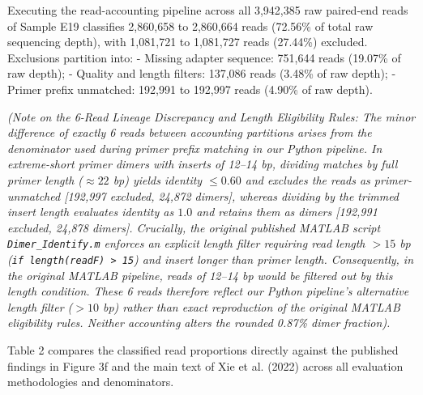 \documentclass[
]{article}
\begin{document}
Executing the read-accounting pipeline across all 3,942,385 raw
paired-end reads of Sample E19 classifies 2,860,658 to 2,860,664 reads
(72.56\% of total raw sequencing depth), with 1,081,721 to 1,081,727
reads (27.44\%) excluded. Exclusions partition into: - Missing adapter
sequence: 751,644 reads (19.07\% of raw depth); - Quality and length
filters: 137,086 reads (3.48\% of raw depth); - Primer prefix unmatched:
192,991 to 192,997 reads (4.90\% of raw depth).

\emph{(Note on the 6-Read Lineage Discrepancy and Length Eligibility
Rules: The minor difference of exactly 6 reads between accounting
partitions arises from the denominator used during primer prefix
matching in our Python pipeline. In extreme-short primer dimers with
inserts of 12--14 bp, dividing matches by full primer length
(\(\approx 22\) bp) yields identity \(\le 0.60\) and excludes the reads
as primer-unmatched {[}192,997 excluded, 24,872 dimers{]}, whereas
dividing by the trimmed insert length evaluates identity as \(1.0\) and
retains them as dimers {[}192,991 excluded, 24,878 dimers{]}. Crucially,
the original published MATLAB script \texttt{Dimer\_Identify.m} enforces
an explicit length filter requiring read length \(> 15\) bp
(\texttt{if\ length(readF)\ \textgreater{}\ 15}) and insert longer than
primer length. Consequently, in the original MATLAB pipeline, reads of
12--14 bp would be filtered out by this length condition. These 6 reads
therefore reflect our Python pipeline's alternative length filter
(\(> 10\) bp) rather than exact reproduction of the original MATLAB
eligibility rules. Neither accounting alters the rounded 0.87\% dimer
fraction).}

Table 2 compares the classified read proportions directly against the
published findings in Figure 3f and the main text of Xie et al. (2022)
across all evaluation methodologies and denominators.
\end{document}
